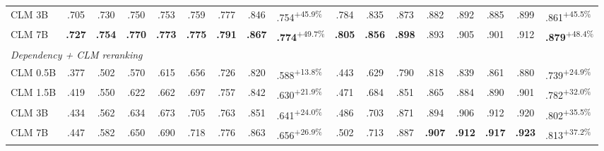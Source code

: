 \begin{table}[t]
\begin{tabular}{lccccccc>{\columncolor{gray!6}}l@{\hspace{10pt}}ccccccc>{\columncolor{gray!6}}l}
CLM 3B & .705 & .730 & .750 & .753 & .759 & .777 & .846 & .754\textsuperscript{$+$45.9\%} & .784 & .835 & .873 & .882 & .892 & .885 & .899 & .861\textsuperscript{$+$45.5\%} \\
CLM 7B & \textbf{.727} & \textbf{.754} & \textbf{.770} & \textbf{.773} & \textbf{.775} & \textbf{.791} & \textbf{.867} & \textbf{.774}\textsuperscript{$+$49.7\%} & \textbf{.805} & \textbf{.856} & \textbf{.898} & .893 & .905 & .901 & .912 & \textbf{.879}\textsuperscript{$+$48.4\%} \\
\midrule
\multicolumn{17}{l}{\textit{Dependency + CLM reranking}} \\
CLM 0.5B & .377 & .502 & .570 & .615 & .656 & .726 & .820 & .588\textsuperscript{$+$13.8\%} & .443 & .629 & .790 & .818 & .839 & .861 & .880 & .739\textsuperscript{$+$24.9\%} \\
CLM 1.5B & .419 & .550 & .622 & .662 & .697 & .757 & .842 & .630\textsuperscript{$+$21.9\%} & .471 & .684 & .851 & .865 & .884 & .890 & .901 & .782\textsuperscript{$+$32.0\%} \\
CLM 3B & .434 & .562 & .634 & .673 & .705 & .763 & .851 & .641\textsuperscript{$+$24.0\%} & .486 & .703 & .871 & .894 & .906 & .912 & .920 & .802\textsuperscript{$+$35.5\%} \\
CLM 7B & .447 & .582 & .650 & .690 & .718 & .776 & .863 & .656\textsuperscript{$+$26.9\%} & .502 & .713 & .887 & \textbf{.907} & \textbf{.912} & \textbf{.917} & \textbf{.923} & .813\textsuperscript{$+$37.2\%} \\
\bottomrule
\end{tabular}
\end{table}
\fi
